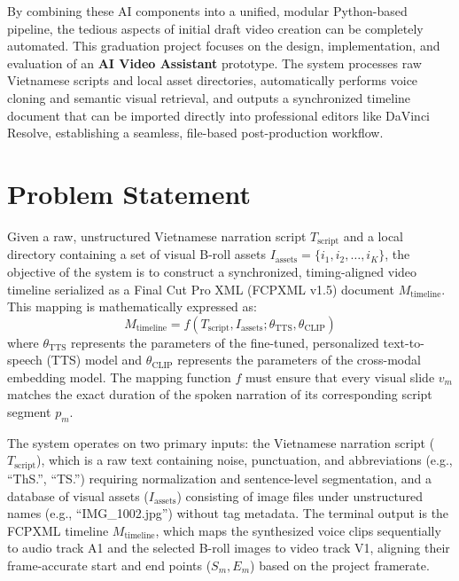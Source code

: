 \documentclass[a4paper,12pt]{report}
\begin{document}
By combining these AI components into a unified, modular Python-based pipeline, the tedious aspects of initial draft video creation can be completely automated. This graduation project focuses on the design, implementation, and evaluation of an \textbf{AI Video Assistant} prototype. The system processes raw Vietnamese scripts and local asset directories, automatically performs voice cloning and semantic visual retrieval, and outputs a synchronized timeline document that can be imported directly into professional editors like DaVinci Resolve, establishing a seamless, file-based post-production workflow.
\section{Problem Statement}
Given a raw, unstructured Vietnamese narration script $T_{\text{script}}$ and a local directory containing a set of visual B-roll assets $I_{\text{assets}} = \{i_1, i_2, \dots, i_K\}$, the objective of the system is to construct a synchronized, timing-aligned video timeline serialized as a Final Cut Pro XML (FCPXML v1.5) document $M_{\text{timeline}}$. This mapping is mathematically expressed as:
\begin{equation}
    M_{\text{timeline}} = f(T_{\text{script}}, I_{\text{assets}}; \theta_{\text{TTS}}, \theta_{\text{CLIP}})
\end{equation}
where $\theta_{\text{TTS}}$ represents the parameters of the fine-tuned, personalized text-to-speech (TTS) model and $\theta_{\text{CLIP}}$ represents the parameters of the cross-modal embedding model. The mapping function $f$ must ensure that every visual slide $v_m$ matches the exact duration of the spoken narration of its corresponding script segment $p_m$.

The system operates on two primary inputs: the Vietnamese narration script ($T_{\text{script}}$), which is a raw text containing noise, punctuation, and abbreviations (e.g., ``ThS.'', ``TS.'') requiring normalization and sentence-level segmentation, and a database of visual assets ($I_{\text{assets}}$) consisting of image files under unstructured names (e.g., ``IMG\_1002.jpg'') without tag metadata. The terminal output is the FCPXML timeline $M_{\text{timeline}}$, which maps the synthesized voice clips sequentially to audio track A1 and the selected B-roll images to video track V1, aligning their frame-accurate start and end points ($S_m, E_m$) based on the project framerate.
\end{document}
